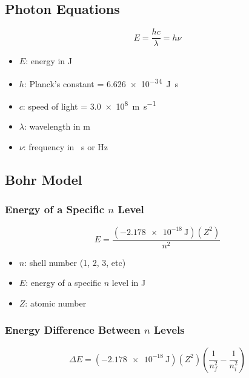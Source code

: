 \documentclass{article}
\begin{document}
\subsection{Photon Equations}

\begin{equation*}
    E = \frac{hc}{\lambda} = h\nu
\end{equation*}

\begin{itemize}
    \item $E$: energy in \si{\joule}
    \item $h$: Planck's constant = \SI{6.626e-34}{\joule\second}
    \item $c$: speed of light = \SI{3.0e8}{\meter \per \second}
    \item $\lambda$: wavelength in \si{\meter}
    \item $\nu$: frequency in \si{\per\second} or \si{\hertz}
\end{itemize}

\subsection{Bohr Model}

\subsubsection{Energy of a Specific $n$ Level}

\begin{equation*}
    E = \frac{(\SI{-2.178e-18}{\joule})(Z^2)}{n^2}
\end{equation*}

\begin{itemize}
    \item $n$: shell number (1, 2, 3, etc)
    \item $E$: energy of a specific $n$ level in \si{\joule}
    \item $Z$: atomic number
\end{itemize}

\subsubsection{Energy Difference Between $n$ Levels}

\begin{equation*}
    \Delta E = (\SI{-2.178e-18}{\joule})(Z^2) \left(\frac{1}{n_f^2} - \frac{1}{n_i^2}\right)
\end{equation*}
\end{document}
